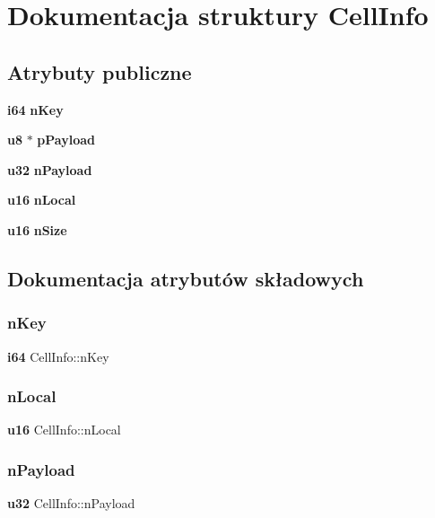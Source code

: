 \section{Dokumentacja struktury Cell\+Info}
\label{struct_cell_info}
\subsection*{Atrybuty publiczne}
\begin{DoxyCompactItemize}
\item 
\textbf{ i64} \textbf{ n\+Key}
\item 
\textbf{ u8} $\ast$ \textbf{ p\+Payload}
\item 
\textbf{ u32} \textbf{ n\+Payload}
\item 
\textbf{ u16} \textbf{ n\+Local}
\item 
\textbf{ u16} \textbf{ n\+Size}
\end{DoxyCompactItemize}


\subsection{Dokumentacja atrybutów składowych}
\mbox{\label{struct_cell_info_a542b041b9a54a13f7c6f2fe63e7542c0}} 
\subsubsection{nKey}
{\footnotesize\ttfamily \textbf{ i64} Cell\+Info\+::n\+Key}

\mbox{\label{struct_cell_info_a8cedbcc2c94916fe5798b502c614bb08}} 
\subsubsection{nLocal}
{\footnotesize\ttfamily \textbf{ u16} Cell\+Info\+::n\+Local}

\mbox{\label{struct_cell_info_ac1e3c1b4216a8e778bbac82907bb1485}} 
\subsubsection{nPayload}
{\footnotesize\ttfamily \textbf{ u32} Cell\+Info\+::n\+Payload}

\mbox{\label{struct_cell_info_ace78ab5eb5337b686e31b895feeb0562}} 
